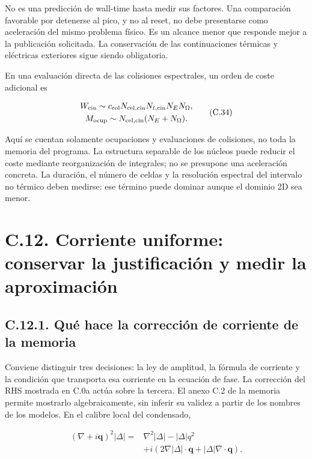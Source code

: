 \documentclass[
  spanish,
  10pt,
  a4paper,
]{article}
\begin{document}
No es una predicción de wall-time hasta medir sus factores. Una
comparación favorable por detenerse al pico, y no al reset, no debe
presentarse como aceleración del mismo problema físico. Es un alcance
menor que responde mejor a la publicación solicitada. La conservación de
las continuaciones térmicas y eléctricas exteriores sigue siendo
obligatoria.

En una evaluación directa de las colisiones espectrales, un orden de
coste adicional es

\[
\begin{gathered}
W_{\rm cin}\sim c_{\rm col}N_{\rm cel,cin}N_{t,\rm cin}N_EN_\Omega,\\
M_{\rm ocup}\sim N_{\rm cel,cin}(N_E+N_\Omega).
\end{gathered} \tag{C.34}
\]

Aquí se cuentan solamente ocupaciones y evaluaciones de colisiones, no
toda la memoria del programa. La estructura separable de los núcleos
puede reducir el coste mediante reorganización de integrales; no se
presupone una aceleración concreta. La duración, el número de celdas y
la resolución espectral del intervalo no térmico deben medirse: ese
término puede dominar aunque el dominio 2D sea menor.

\section{C.12. Corriente uniforme: conservar la justificación y medir la
aproximación}\label{c.12.-corriente-uniforme-conservar-la-justificaciuxf3n-y-medir-la-aproximaciuxf3n}

\subsection{C.12.1. Qué hace la corrección de corriente de la
memoria}\label{c.12.1.-quuxe9-hace-la-correcciuxf3n-de-corriente-de-la-memoria}

Conviene distinguir tres decisiones: la ley de amplitud, la fórmula de
corriente y la condición que transporta esa corriente en la ecuación de
fase. La corrección del RHS mostrada en C.0a actúa sobre la tercera. El
anexo C.2 de la memoria permite mostrarlo algebraicamente, sin inferir
su validez a partir de los nombres de los modelos. En el calibre local
del condensado,

\[
\begin{aligned}
(\nabla+i\mathbf q)^2|\Delta|
={}&\nabla^2|\Delta|-|\Delta|q^2\\
&+i\left(2\nabla|\Delta|\!\cdot\!\mathbf q
+|\Delta|\nabla\!\cdot\!\mathbf q\right).
\end{aligned}
\tag{C.35a}
\]
\end{document}
